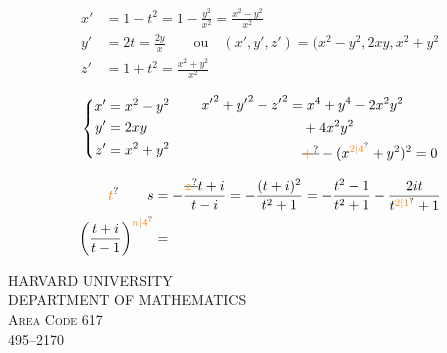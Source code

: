 
\[
\begin{aligned}
x'&=1-t^2=1-\frac{y^2}{x^2}=\frac{x^2-y^2}{x^2}\\
y'&=2t=\frac{2y}{x}\qquad\text{ou}\quad (x',y',z')=(x^2-y^2,2xy,x^2+y^2\\
z'&=1+t^2=\frac{x^2+y^2}{x^2}
\end{aligned}
\]

\[
\left\{\begin{aligned}
x'&=x^2-y^2\\y'&=2xy\\z'&=x^2+y^2
\end{aligned}\right.
\qquad
\begin{aligned}
{x'}^2+{y'}^2-{z'}^2&=x^4+y^4-2x^2y^2\\
&\quad+4x^2y^2\\
&\quad\deleted{\unsure{+}}-(x^{\unsure{2|4}}+y^2)^2=0
\end{aligned}
\]


\[
\begin{aligned}
\unsure{t}\qquad s&=-\frac{\deleted{\unsure{z}}t+i}{t-i}=-\frac{(t+i)^2}{t^2+1}=-\frac{t^2-1}{t^2+1}-\frac{2it}{t^{\unsure{2|1}}+1}\\
\left(\frac{t+i}{t-1}\right)^{\unsure{n|4}}&=
\end{aligned}
\]

HARVARD UNIVERSITY\\
DEPARTMENT OF MATHEMATICS\\
\textsc{Area Code} 617\\
495--2170

